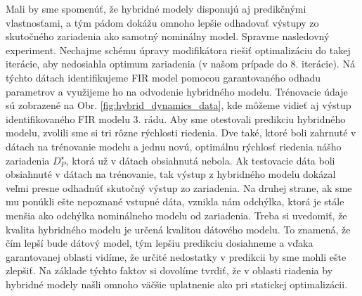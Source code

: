 Mali by sme spomenúť, že hybridné modely disponujú aj predikčnými vlastnosťami, a tým pádom dokážu omnoho lepšie odhadovať výstupy zo skutočného zariadenia ako samotný nominálny model. Spravme nasledovný experiment. Nechajme schému úpravy modifikátora riešiť optimalizáciu do takej iterácie, aby nedosiahla optimum zariadenia (v našom prípade do 8. iterácie). Ná týchto dátach identifikujeme FIR model pomocou garantovaného odhadu parametrov a využijeme ho na odvodenie hybridného modelu. Trénovacie údaje sú zobrazené na Obr. \ref{fig:hybrid_dynamics_data}, kde môžeme vidieť aj výstup identifikovaného FIR modelu 3. rádu. Aby sme otestovali predikciu hybridného modelu, zvolili sme si tri rôzne rýchlosti riedenia. Dve také, ktoré boli zahrnuté v dátach na trénovanie modelu a jednu novú, optimálnu rýchlosť riedenia nášho zariadenia $ D_{P}^{\star} $, ktorá už v dátach obsiahnutá nebola. Ak testovacie dáta boli obsiahnuté v dátach na trénovanie, tak výstup z hybridného modelu dokázal veľmi presne odhadnúť skutočný výstup zo zariadenia. Na druhej strane, ak sme mu ponúkli ešte nepoznané vstupné dáta, vznikla nám odchýlka, ktorá je stále menšia ako odchýlka nominálneho modelu od zariadenia. Treba si uvedomiť, že kvalita hybridného modelu je určená kvalitou dátového modelu. To znamená, že čím lepší bude dátový model, tým lepšiu predikciu dosiahneme a vďaka garantovanej oblasti vidíme, že určité nedostatky v predikcii by sme mohli ešte zlepšiť. Na základe týchto faktov si dovolíme tvrdiť, že v oblasti riadenia by hybridné modely našli omnoho väčšie uplatnenie ako pri statickej optimalizácii.
